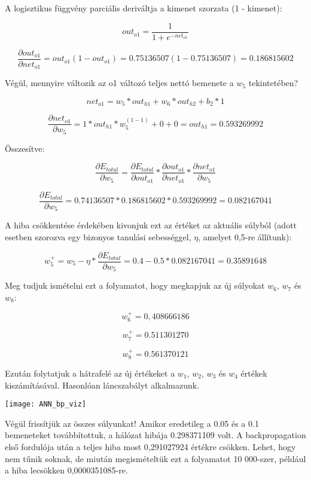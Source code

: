 A logisztikus függvény parciális deriváltja a kimenet szorzata (1 - kimenet):

\[out_{o1} = \frac{1}{1+e^{-net_{o1}}}\]

\[\frac{\partial out_{o1}}{\partial net_{o1}} = out_{o1}(1 - out_{o1}) = 0.75136507(1 - 0.75136507) = 0.186815602\]

Végül, mennyire változik az o1 változó teljes nettó bemenete a \(w_5\) tekintetében?

\[net_{o1} = w_5 * out_{h1} + w_6 * out_{h2} + b_2 * 1\]

\[\frac{\partial net_{o1}}{\partial w_{5}} = 1 * out_{h1} * w_5^{(1 - 1)} + 0 + 0 = out_{h1} = 0.593269992\]

Összesítve:

\[\frac{\partial E_{total}}{\partial w_{5}} = \frac{\partial E_{total}}{\partial out_{o1}} * \frac{\partial out_{o1}}{\partial net_{o1}} * \frac{\partial net_{o1}}{\partial w_{5}}\]

\[\frac{\partial E_{total}}{\partial w_{5}} = 0.74136507 * 0.186815602 * 0.593269992 = 0.082167041\]

A hiba csökkentése érdekében kivonjuk ezt az értéket az aktuális súlyból (adott esetben szorozva egy bizonyos tanulási sebességgel, $\eta$, amelyet 0,5-re állítunk):

\[w_5^{+} = w_5 - \eta * \frac{\partial E_{total}}{\partial w_{5}} = 0.4 - 0.5 * 0.082167041 = 0.35891648\]

Meg tudjuk ismételni ezt a folyamatot, hogy megkapjuk az új súlyokat $w_6$, $w_7$ és $w_8$:

\[w_6 ^ {+} = 0,408666186\]

\[w_7 ^ {+} = 0.511301270\]

\[w_8 ^ {+} = 0.561370121\]

Ezután folytatjuk a hátrafelé az új értékeket a $w_1$, $w_2$, $w_3$ és $w_4$ értékek kiszámításával. Hasonlóan láncszabályt alkalmazunk.

\begin{center}
\texttt{[image: ANN\_bp\_viz]}
\end{center}

Végül frissítjük az összes súlyunkat! Amikor eredetileg a 0.05 és a 0.1 bemeneteket továbbítottuk, a hálózat hibája 0.298371109 volt. A backpropagation első fordulója után a teljes hiba most 0,291027924 értékre csökken. Lehet, hogy nem tűnik soknak, de miután megismételtük ezt a folyamatot 10 000-szer, például a hiba lecsökken 0,0000351085-re.\\

